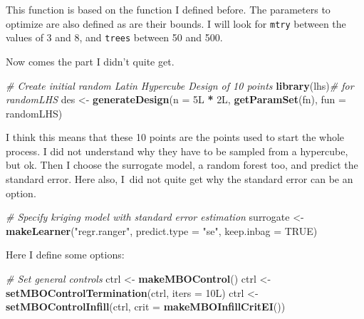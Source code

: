 \documentclass[]{gitbook}
\newenvironment{Shaded}{\begin{snugshade}}{\end{snugshade}}
\newcommand{\CommentTok}[1]{\textcolor[rgb]{0.56,0.35,0.01}{\textit{#1}}}
\newcommand{\DataTypeTok}[1]{\textcolor[rgb]{0.13,0.29,0.53}{#1}}
\newcommand{\KeywordTok}[1]{\textcolor[rgb]{0.13,0.29,0.53}{\textbf{#1}}}
\newcommand{\NormalTok}[1]{#1}
\newcommand{\OperatorTok}[1]{\textcolor[rgb]{0.81,0.36,0.00}{\textbf{#1}}}
\newcommand{\OtherTok}[1]{\textcolor[rgb]{0.56,0.35,0.01}{#1}}
\newcommand{\StringTok}[1]{\textcolor[rgb]{0.31,0.60,0.02}{#1}}
\begin{document}
This function is based on the function I defined before. The parameters to optimize are also
defined as are their bounds. I will look for \texttt{mtry} between the values of 3 and 8, and \texttt{trees}
between 50 and 500.

Now comes the part I didn't quite get.

\begin{Shaded}
\begin{Highlighting}[]
\CommentTok{# Create initial random Latin Hypercube Design of 10 points}
\KeywordTok{library}\NormalTok{(lhs)}\CommentTok{# for randomLHS}
\NormalTok{des <-}\StringTok{ }\KeywordTok{generateDesign}\NormalTok{(}\DataTypeTok{n =}\NormalTok{ 5L }\OperatorTok{*}\StringTok{ }\NormalTok{2L, }\KeywordTok{getParamSet}\NormalTok{(fn), }\DataTypeTok{fun =}\NormalTok{ randomLHS)}
\end{Highlighting}
\end{Shaded}

I think this means that these 10 points are the points used to start the whole process. I did not
understand why they have to be sampled from a hypercube, but ok. Then I choose the surrogate model,
a random forest too, and predict the standard error. Here also, I~did not quite get why the
standard error can be an option.

\begin{Shaded}
\begin{Highlighting}[]
\CommentTok{# Specify kriging model with standard error estimation}
\NormalTok{surrogate <-}\StringTok{ }\KeywordTok{makeLearner}\NormalTok{(}\StringTok{"regr.ranger"}\NormalTok{, }\DataTypeTok{predict.type =} \StringTok{"se"}\NormalTok{, }\DataTypeTok{keep.inbag =} \OtherTok{TRUE}\NormalTok{)}
\end{Highlighting}
\end{Shaded}

Here I define some options:

\begin{Shaded}
\begin{Highlighting}[]
\CommentTok{# Set general controls}
\NormalTok{ctrl <-}\StringTok{ }\KeywordTok{makeMBOControl}\NormalTok{()}
\NormalTok{ctrl <-}\StringTok{ }\KeywordTok{setMBOControlTermination}\NormalTok{(ctrl, }\DataTypeTok{iters =}\NormalTok{ 10L)}
\NormalTok{ctrl <-}\StringTok{ }\KeywordTok{setMBOControlInfill}\NormalTok{(ctrl, }\DataTypeTok{crit =} \KeywordTok{makeMBOInfillCritEI}\NormalTok{())}
\end{Highlighting}
\end{Shaded}
\end{document}

